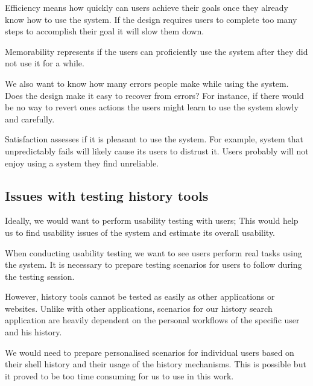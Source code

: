 Efficiency means how quickly can users achieve their goals once they already know how to use the system. If the design requires users to complete too many steps to accomplish their goal it will slow them down. 

Memorability represents if the users can proficiently use the system after they did not use it for a while. 

We also want to know how many errors people make while using the system. Does the design make it easy to recover from errors? For instance, if there would be no way to revert ones actions the users might learn to use the system slowly and carefully. 

Satisfaction assesses if it is pleasant to use the system. For example, system that unpredictably fails will likely cause its users to distrust it. Users probably will not enjoy using a system they find unreliable. 


\subsection{Issues with testing history tools}

Ideally, we would want to perform usability testing with users; This would help us to find usability issues of the system and estimate its overall usability.

When conducting usability testing we want to see users perform real tasks using the system. It is necessary to prepare testing scenarios for users to follow during the testing session.

However, history tools cannot be tested as easily as other applications or websites.
Unlike with other applications, scenarios for our history search application are heavily dependent on the personal workflows of the specific user and his history.


We would need to prepare personalised scenarios for individual users based on their shell history and their usage of the history mechanisms.
This is possible but it proved to be too time consuming for us to use in this work.

